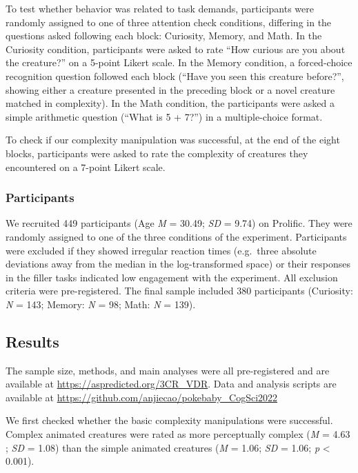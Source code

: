 \documentclass[
  man,floatsintext]{apa6}
\begin{document}
To test whether behavior was related to task demands, participants were randomly assigned to one of three attention check conditions, differing in the questions asked following each block: Curiosity, Memory, and Math. In the Curiosity condition, participants were asked to rate ``How curious are you about the creature?'' on a 5-point Likert scale. In the Memory condition, a forced-choice recognition question followed each block (``Have you seen this creature before?'', showing either a creature presented in the preceding block or a novel creature matched in complexity). In the Math condition, the participants were asked a simple arithmetic question (``What is 5 + 7?'') in a multiple-choice format.

To check if our complexity manipulation was successful, at the end of the eight blocks, participants were asked to rate the complexity of creatures they encountered on a 7-point Likert scale.

\hypertarget{participants}{%
\subsubsection{Participants}\label{participants}}

We recruited 449 participants (Age \emph{M} = 30.49; \emph{SD} = 9.74) on Prolific. They were randomly assigned to one of the three conditions of the experiment. Participants were excluded if they showed irregular reaction times (e.g.~three absolute deviations away from the median in the log-transformed space) or their responses in the filler tasks indicated low engagement with the experiment. All exclusion criteria were pre-registered. The final sample included 380 participants (Curiosity: \emph{N} = 143; Memory: \emph{N} = 98; Math: \emph{N} = 139).

\hypertarget{results}{%
\subsection{Results}\label{results}}

The sample size, methods, and main analyses were all pre-registered and are available at \url{https://aspredicted.org/3CR_VDR}. Data and analysis scripts are available at \url{https://github.com/anjiecao/pokebaby_CogSci2022}

We first checked whether the basic complexity manipulations were successful. Complex animated creatures were rated as more perceptually complex (\emph{M} = 4.63 ; \emph{SD} = 1.08) than the simple animated creatures (\emph{M} = 1.06; \emph{SD} = 1.06; \emph{p} \textless{} 0.001).
\end{document}
